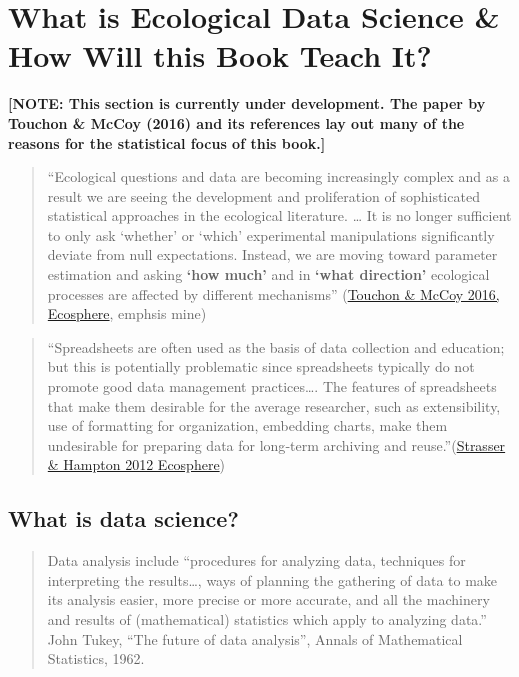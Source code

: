\documentclass[]{book}
\theoremstyle{definition}
\theoremstyle{definition}
\theoremstyle{definition}
\theoremstyle{remark}
\begin{document}
\chapter{What is Ecological Data Science \& How Will this Book Teach
It?}\label{what-is-ecological-data-science-how-will-this-book-teach-it}

\textbf{{[}NOTE: This section is currently under development. The paper
by Touchon \& McCoy (2016) and its references lay out many of the
reasons for the statistical focus of this book.{]}}

\begin{quote}
``Ecological questions and data are becoming increasingly complex and as
a result we are seeing the development and proliferation of
sophisticated statistical approaches in the ecological literature.
\ldots{} It is no longer sufficient to only ask `whether' or `which'
experimental manipulations significantly deviate from null expectations.
Instead, we are moving toward parameter estimation and asking
\textbf{`how much'} and in \textbf{`what direction'} ecological
processes are affected by different mechanisms''
(\href{https://esajournals.onlinelibrary.wiley.com/doi/abs/10.1002/ecs2.1394}{Touchon
\& McCoy 2016, Ecosphere}, emphsis mine)
\end{quote}

\begin{quote}
``Spreadsheets are often used as the basis of data collection and
education; but this is potentially problematic since spreadsheets
typically do not promote good data management practices\ldots{}. The
features of spreadsheets that make them desirable for the average
researcher, such as extensibility, use of formatting for organization,
embedding charts, make them undesirable for preparing data for long‐term
archiving and
reuse.''(\href{https://esajournals.onlinelibrary.wiley.com/doi/abs/10.1890/ES12-00139.1}{Strasser
\& Hampton 2012 Ecosphere})
\end{quote}

\section{What is data science?}\label{what-is-data-science}

\begin{quote}
Data analysis include ``procedures for analyzing data, techniques for
interpreting the results\ldots{}, ways of planning the gathering of data
to make its analysis easier, more precise or more accurate, and all the
machinery and results of (mathematical) statistics which apply to
analyzing data.'' John Tukey, ``The future of data analysis'', Annals of
Mathematical Statistics, 1962.
\end{quote}
\end{document}

